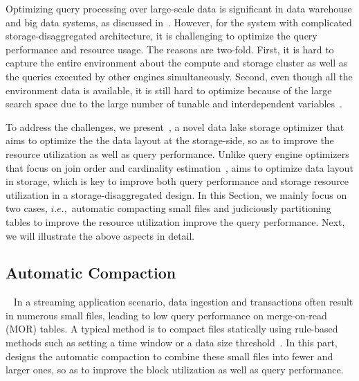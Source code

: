 Optimizing  query processing over large-scale data is significant in data warehouse and big data systems, as discussed in~\cite{oracle, tere, survey, eltabakh2021not, pandit2015accelerating, armbrust2015spark}. However, for the \sys system with
complicated storage-disaggregated architecture, it is challenging to optimize the query performance and resource usage. The reasons are two-fold. First, it is hard to capture the entire environment about the compute and storage cluster as well as the queries executed by other engines simultaneously. Second, even though all the environment data is available, it is still hard to optimize because of the large search space due to the large number of tunable and interdependent variables~\cite{jindal2021microlearner}.


To address the challenges, we present~\brain, a novel data lake storage optimizer that aims to optimize the  the data layout at the storage-side, so as to improve the resource utilization as well as  query performance.
Unlike query engine optimizers that focus on join order and cardinality estimation~\cite{rtos, deepdb, naru}, \brain aims to optimize data layout in storage, which is key to improve both query performance and storage resource utilization in a storage-disaggregated design. In this Section, we mainly focus on two cases, $i.e.,$ automatic compacting small files  and judiciously partitioning tables to improve the resource utilization improve the query performance.
Next, we will illustrate the above aspects in detail.

\subsection{Automatic Compaction}~\label{subsec:compaction}
In a streaming application scenario, data ingestion and transactions often result in numerous small files, leading to low query performance on merge-on-read (MOR) tables. 
A typical method is to compact files statically using rule-based methods such as setting a time window or a data size threshold~\cite{iceberg,hudi}.
In this part, \brain  designs the automatic compaction to combine these small files into fewer and larger ones, so as to  improve the block utilization  as well as query performance.

